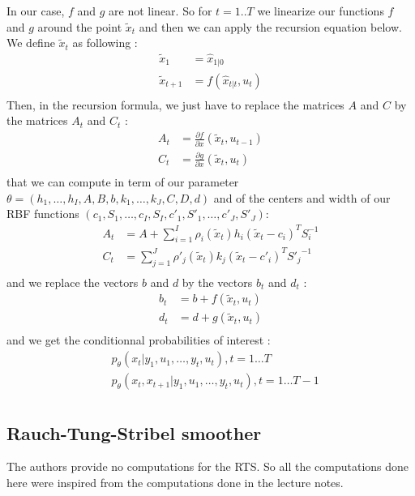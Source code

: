 In our case, $f$ and $g$ are not linear.
So for $t=1..T$ we linearize our functions $f$ and $g$ around the point $\tilde{x}_t$ and then we can apply the recursion equation below.
We define $\tilde{x}_t$ as following :
\begin{align*}
  \tilde{x}_1 &= \hat{x}_{1|0}\\
  \tilde{x}_{t+1} &= f(\hat{x}_{t|t}, u_t)\\
\end{align*}
Then, in the recursion formula, we just have to replace the matrices $A$ and $C$  by the matrices $A_t$ and $C_t$ :
\begin{align*}
  A_t &= \frac{\partial f}{\partial x}(\tilde{x}_t, u_{t-1})\\
  C_t &= \frac{\partial g}{\partial x}(\tilde{x}_t, u_t)\\
\end{align*}
that we can compute in term of our parameter $\theta = \left( h_1, \ldots , h_I, A, B, b, k_1, \ldots , k_J, C, D, d \right)$ and of the centers and width of our RBF functions $(c_1, S_1, \ldots ,c_I, S_I, c'_1, S'_1, \ldots , c'_J, S'_J)$:
\begin{align*}
  A_t &= A + \sum_{i=1}^I \rho_i(\tilde{x}_t) h_i (\tilde{x}_t - c_i)^T S_i^{-1}\\
  C_t &= \sum_{j=1}^J \rho'_j(\tilde{x}_t) k_j (\tilde{x}_t - c'_i)^T {S'_j}^{-1}\\
\end{align*}
and we replace the vectors $b$ and $d$ by the vectors $b_t$ and $d_t$ :
\begin{align*}
  b_t &= b + f(\tilde{x}_t, u_t)\\
  d_t &= d + g(\tilde{x}_t, u_t)\\
\end{align*}
and we get the conditionnal probabilities of interest :
\begin{align*}
  &p_{\theta}\left(x_t|y_1, u_1, \ldots, y_t, u_t \right ), t=1 \ldots T\\
  &p_{\theta}\left(x_t, x_{t+1}|y_1, u_1, \ldots, y_t, u_t \right ), t=1 \ldots T-1\\
\end{align*}

\subsection{Rauch-Tung-Stribel smoother}
The authors provide no computations for the RTS.
So all the computations done here were inspired from the computations done in the lecture notes.

